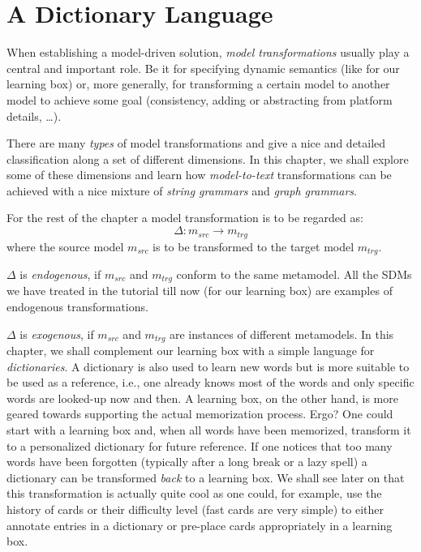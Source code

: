 \chapter{A Dictionary Language}
\label{chap:A-Dictionary-Language}

When establishing a model-driven solution, \emph{model transformations} usually play a central and important role.
Be it for specifying dynamic semantics (like for our learning box) or, more generally, for transforming a certain model to another model to achieve some goal (consistency, adding or abstracting from platform details, \ldots).  

There are many \emph{types} of model transformations and \cite{CH03,Mens_Gorp_2006} give a nice and detailed classification along a set of different dimensions. 
In this chapter, we shall explore some of these dimensions and learn how \emph{model-to-text} transformations can be achieved with a nice mixture of \emph{string grammars} and \emph{graph grammars}. 

For the rest of the chapter a model transformation is to be regarded as:
\begin{displaymath}
 	\Delta: m_{src} \rightarrow m_{trg}
\end{displaymath}
where the source model $m_{src}$ is to be transformed to the target model $m_{trg}$.

$\Delta$ is \emph{endogenous}, if $m_{src}$ and $m_{trg}$ conform to the same metamodel.
All the SDMs we have treated in the tutorial till now (for our learning box) are examples of endogenous transformations.

$\Delta$ is \emph{exogenous}, if $m_{src}$ and $m_{trg}$ are instances of different metamodels.
In this chapter, we shall complement our learning box with a simple language for \emph{dictionaries}.
A dictionary is also used to learn new words but is more suitable to be used as a reference, i.e., one already knows most of the words and only specific words are looked-up now and then.
A learning box, on the other hand, is more geared towards supporting the actual memorization process.
Ergo?  One could start with a learning box and, when all words have been memorized, transform it to a personalized dictionary for future reference.
If one notices that too many words have been forgotten (typically after a long break or a lazy spell) a dictionary can be transformed \emph{back} to a learning box.
We shall see later on that this transformation is actually quite cool as one could, for example, use the history of cards or their difficulty level (fast cards are very simple) to either annotate entries in a dictionary or pre-place cards appropriately in a learning box. 

